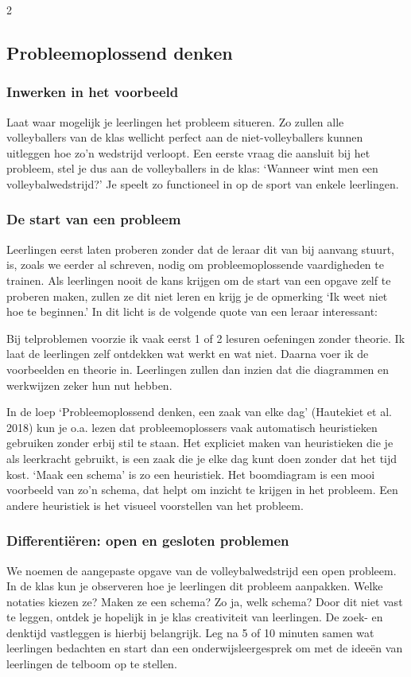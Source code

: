 \begin{multicols}{2}
\subsection*{Probleemoplossend denken}
\subsubsection{Inwerken in het voorbeeld}
Laat waar mogelijk je leerlingen het probleem situeren. Zo zullen alle volleyballers van de klas wellicht perfect aan de niet-volleyballers kunnen uitleggen hoe zo’n wedstrijd verloopt. Een eerste vraag die aansluit bij het probleem, stel je dus aan de volleyballers in de klas: ‘Wanneer wint men een volleybalwedstrijd?’ Je speelt zo functioneel in op de sport van enkele leerlingen. 
\subsubsection{De start van een probleem}
Leerlingen eerst laten proberen zonder dat de leraar dit van bij aanvang stuurt, is, zoals we eerder al schreven, nodig om probleemoplossende vaardigheden te trainen. Als leerlingen nooit de kans krijgen om de start van een opgave zelf te proberen maken, zullen ze dit niet leren en krijg je de opmerking ‘Ik weet niet hoe te beginnen.’ In dit licht is de volgende quote van een leraar interessant:
\begin{citaat}
    Bij telproblemen voorzie ik vaak eerst 1 of 2 lesuren oefeningen zonder theorie. Ik laat de leerlingen zelf ontdekken wat werkt en wat niet. Daarna voer ik de voorbeelden en theorie in. Leerlingen zullen dan inzien dat die diagrammen en werkwijzen zeker hun nut hebben.
\end{citaat}
In de loep ‘Probleemoplossend denken, een zaak van elke dag’ (Hautekiet et al. 2018) kun je o.a. lezen dat probleemoplossers vaak automatisch heuristieken gebruiken zonder erbij stil te staan. Het expliciet maken van heuristieken die je als leerkracht gebruikt, is een zaak die je elke dag kunt doen zonder dat het tijd kost. ‘Maak een schema’ is zo een heuristiek. Het boomdiagram is een mooi voorbeeld van zo’n schema, dat helpt om inzicht te krijgen in het probleem. Een andere heuristiek is het visueel voorstellen van het probleem. 

\subsubsection{Differentiëren: open en gesloten problemen}
We noemen de aangepaste opgave van de volleybalwedstrijd een open probleem. In de klas kun je observeren hoe je leerlingen dit probleem aanpakken. Welke notaties kiezen ze? Maken ze een schema? Zo ja, welk schema? Door dit niet vast te leggen, ontdek je hopelijk in je klas creativiteit van leerlingen. De zoek- en denktijd vastleggen is hierbij belangrijk. Leg na 5 of 10 minuten samen wat leerlingen bedachten en start dan een onderwijsleergesprek om met de ideeën van leerlingen de telboom op te stellen. 


\end{multicols}
